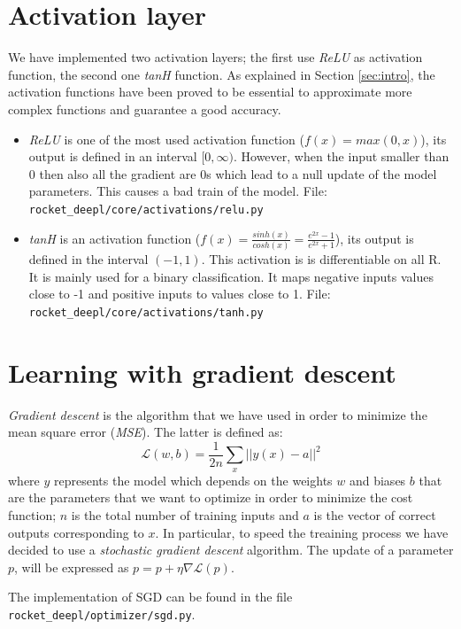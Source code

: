 \documentclass[journal, a4paper]{IEEEtran}
\begin{document}
\section{Activation layer}
\label{sec:activation}
We have implemented two activation layers; the first use \textit{ReLU} as activation function, the second one \textit{tanH} function. 
As explained in Section \ref{sec:intro}, the activation functions have been proved to be essential to approximate more complex functions and guarantee a good accuracy.
\begin{itemize}
    \item \textit{ReLU} is one of the most used activation function ($f(x) = max(0, x)$), its output is defined in an interval $[0, \infty )$. However, when the input smaller than 0 then also all the gradient are 0s which lead to a null update of the model parameters. This causes a bad train of the model. File: \texttt{rocket\_deepl/core/activations/relu.py}
    \item \textit{tanH} is an activation function ($f(x) = \frac{sinh(x)}{cosh(x)} = \frac{e^{2x} - 1}{e^{2x} + 1}$), its output is defined in the interval $(-1, 1)$. This activation is is differentiable on all R. It is mainly used for a binary classification. It maps negative inputs values close to -1 and positive inputs to values close to 1. File: \texttt{rocket\_deepl/core/activations/tanh.py}
\end{itemize}


\section{Learning with gradient descent}
\label{sec:learning}
\textit{Gradient descent} is the algorithm that we have used in order to minimize the mean square error (\textit{MSE}). The latter is defined as:
$$\mathcal{L}(w, b) = \frac{1}{2n} \sum_x ||y(x) - a||^2 $$
where $y$ represents the model which depends on the weights $w$ and biases $b$ that are the parameters that we want to optimize in order to minimize the cost function; $n$ is the total number of training inputs and $a$ is the vector of correct outputs corresponding to $x$. In particular, to speed the treaining process we have decided to use a \textit{stochastic gradient descent} algorithm. 
The update of a parameter $p$, will be expressed as 
$ p = p + \eta \nabla \mathcal{L} (p)$.
\cite{reference1}

The implementation of SGD can be found in the file \texttt{rocket\_deepl/optimizer/sgd.py}.
\end{document}
